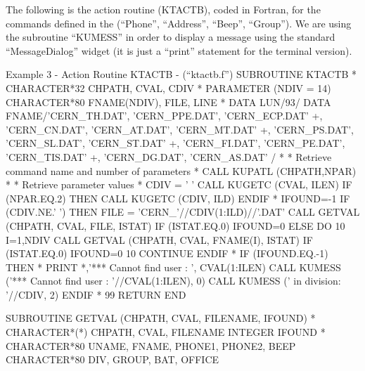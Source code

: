 The following is the action routine (KTACTB), coded in Fortran, for the
commands defined in the \CDF{} (``Phone'', ``Address'', ``Beep'', ``Group'').
We are using the \KUIP{} subroutine ``KUMESS'' in order to display
a message using the standard \Motif{} ``MessageDialog'' widget (it is
just a ``print'' statement for the terminal version).

\begin{XMPt} {Example 3 - Action Routine KTACTB - (``ktactb.f'')}
      SUBROUTINE KTACTB
*
      CHARACTER*32 CHPATH, CVAL, CDIV
*
      PARAMETER (NDIV = 14)
      CHARACTER*80 FNAME(NDIV), FILE, LINE
*
      DATA LUN/93/
      DATA FNAME/'CERN_TH.DAT', 'CERN_PPE.DAT', 'CERN_ECP.DAT'
     +,          'CERN_CN.DAT', 'CERN_AT.DAT', 'CERN_MT.DAT'
     +,          'CERN_PS.DAT', 'CERN_SL.DAT', 'CERN_ST.DAT'
     +,          'CERN_FI.DAT', 'CERN_PE.DAT', 'CERN_TIS.DAT'
     +,          'CERN_DG.DAT', 'CERN_AS.DAT' /
*
* Retrieve command name and number of parameters
*
      CALL KUPATL (CHPATH,NPAR)
*
* Retrieve parameter values
*
      CDIV = ' '
      CALL KUGETC (CVAL, ILEN)
      IF (NPAR.EQ.2) THEN
          CALL KUGETC (CDIV, ILD)
      ENDIF
*
      IFOUND=-1
      IF (CDIV.NE.' ') THEN
          FILE = 'CERN_'//CDIV(1:ILD)//'.DAT'
          CALL GETVAL (CHPATH, CVAL, FILE, ISTAT) 
          IF (ISTAT.EQ.0) IFOUND=0
      ELSE
          DO 10 I=1,NDIV
             CALL GETVAL (CHPATH, CVAL, FNAME(I), ISTAT)
             IF (ISTAT.EQ.0) IFOUND=0
  10  CONTINUE
      ENDIF
*
      IF (IFOUND.EQ.-1) THEN
*         PRINT *,'*** Cannot find user : ', CVAL(1:ILEN)
          CALL KUMESS ('*** Cannot find user : '//CVAL(1:ILEN), 0)
          CALL KUMESS ('    in division: '//CDIV, 2)
      ENDIF
*
 99   RETURN
      END

      SUBROUTINE GETVAL (CHPATH, CVAL, FILENAME, IFOUND)
*
      CHARACTER*(*) CHPATH, CVAL, FILENAME
      INTEGER      IFOUND
*
      CHARACTER*80 UNAME, FNAME, PHONE1, PHONE2, BEEP
      CHARACTER*80 DIV, GROUP, BAT, OFFICE


\end{XMPt}
